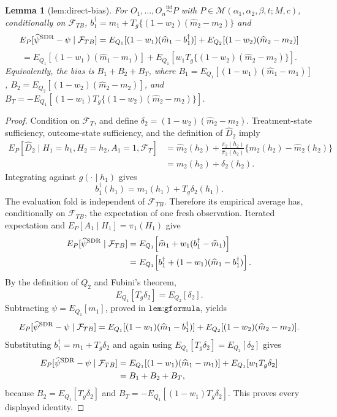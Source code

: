 \documentclass{article}
\newtheorem{lemma}{Lemma}
\begin{document}
\begin{lemma}[lem:direct-bias]\label{lem:direct-bias}
For \(O_1,\ldots,O_n\overset{\mathrm{iid}}{\sim}P\) with \(P\in\mathcal M(\alpha_1,\alpha_2,\beta,t;M,c)\), conditionally on \(\mathcal F_{TB}\), \(b_1^\dagger=m_1+T_g\{(1-w_2)(\widehat m_2-m_2)\}\) and \[E_P[\widehat\psi^{\rm SDR}-\psi\mid\mathcal F_{TB}]=E_{Q_1}[(1-w_1)(\widehat m_1-b_1^\dagger)]+E_{Q_2}[(1-w_2)(\widehat m_2-m_2)]\] \[=E_{Q_1}[(1-w_1)(\widehat m_1-m_1)]+E_{Q_1}[w_1T_g\{(1-w_2)(\widehat m_2-m_2)\}].\] Equivalently, the bias is \(B_1+B_2+B_T\), where \(B_1=E_{Q_1}[(1-w_1)(\widehat m_1-m_1)]\), \(B_2=E_{Q_2}[(1-w_2)(\widehat m_2-m_2)]\), and \(B_T=-E_{Q_1}[(1-w_1)T_g\{(1-w_2)(\widehat m_2-m_2)\}]\).
\end{lemma}
\begin{proof}
Condition on \(\mathcal F_T\), and define \(\delta_2=(1-w_2)(\widehat m_2-m_2)\). Treatment-state sufficiency, outcome-state sufficiency, and the definition of \(\widehat D_2\) imply
\[\begin{aligned}E_P[\widehat D_2\mid H_1=h_1,H_2=h_2,A_1=1,\mathcal F_T]&=\widehat m_2(h_2)+\frac{\pi_2(h_2)}{\widehat\pi_2(h_2)}\{m_2(h_2)-\widehat m_2(h_2)\}\\&=m_2(h_2)+\delta_2(h_2).\end{aligned}\]
Integrating against \(g(\cdot\mid h_1)\) gives
\[b_1^\dagger(h_1)=m_1(h_1)+T_g\delta_2(h_1).\]
The evaluation fold is independent of \(\mathcal F_{TB}\). Therefore its empirical average has, conditionally on \(\mathcal F_{TB}\), the expectation of one fresh observation. Iterated expectation and \(E_P[A_1\mid H_1]=\pi_1(H_1)\) give
\[\begin{aligned}E_P[\widehat\psi^{\rm SDR}\mid\mathcal F_{TB}]&=E_{Q_1}\!\left[\widehat m_1+w_1(b_1^\dagger-\widehat m_1)\right]\\&=E_{Q_1}\!\left[b_1^\dagger+(1-w_1)(\widehat m_1-b_1^\dagger)\right].\end{aligned}\]
By the definition of \(Q_2\) and Fubini's theorem,
\[E_{Q_1}[T_g\delta_2]=E_{Q_2}[\delta_2].\]
Subtracting \(\psi=E_{Q_1}[m_1]\), proved in \(\texttt{lem:gformula}\), yields
\[E_P[\widehat\psi^{\rm SDR}-\psi\mid\mathcal F_{TB}]=E_{Q_1}[(1-w_1)(\widehat m_1-b_1^\dagger)]+E_{Q_2}[(1-w_2)(\widehat m_2-m_2)].\]
Substituting \(b_1^\dagger=m_1+T_g\delta_2\) and again using \(E_{Q_1}[T_g\delta_2]=E_{Q_2}[\delta_2]\) gives
\[\begin{aligned}E_P[\widehat\psi^{\rm SDR}-\psi\mid\mathcal F_{TB}]&=E_{Q_1}[(1-w_1)(\widehat m_1-m_1)]+E_{Q_1}[w_1T_g\delta_2]\\&=B_1+B_2+B_T,\end{aligned}\]
because \(B_2=E_{Q_1}[T_g\delta_2]\) and \(B_T=-E_{Q_1}[(1-w_1)T_g\delta_2]\). This proves every displayed identity.
\end{proof}
\end{document}
